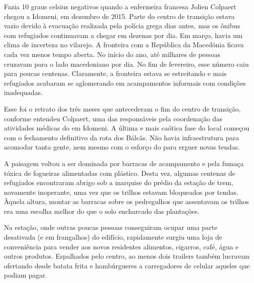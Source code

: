 \putodd{}
\clearpage
{}
 

Fazia 10 graus celsius negativos quando a enfermeira francesa Jolien
Colpaert chegou a Idomeni, em dezembro de 2015. Parte do centro de
transição estava vazio devido à evacuação realizada pela polícia grega
dias antes, mas os ônibus com refugiados continuavam a chegar em dezenas
por dia. Em março, havia um clima de incerteza no vilarejo. 
A fronteira com a República da Macedônia ficava cada vez menos
tempo aberta. No início do ano, até milhares de pessoas cruzavam para o
lado macedoniano por dia. No fim de fevereiro, esse número caiu para
poucas centenas. Claramente, a fronteira estava se estreitando e mais
refugiados acabaram se aglomerando em acampamentos informais com
condições inadequadas.

Esse foi o retrato dos três meses que antecederam o fim do centro de
transição, conforme entendeu Colpaert, uma das responsáveis pela coordenação das
atividades médicas do  em Idomeni. A última e mais
caótica fase do local começou com o fechamento definitivo da rota
dos Bálcãs. Não havia infraestrutura para acomodar tanta gente, nem
mesmo com o esforço do  para erguer novas tendas.

A paisagem voltou a ser dominada por barracas de acampamento e pela
fumaça tóxica de fogueiras alimentadas com plástico. Desta
vez, algumas centenas de refugiados encontraram abrigo sob a marquise do
prédio da estação de trem, novamente inoperante, uma vez que os trilhos
estavam bloqueados por tendas. Àquela altura, montar as barracas sobre os pedregulhos que assentavam os trilhos era uma escolha melhor do que o solo encharcado das plantações. 
% 
% 
% 
%
%


Na estação, onde outras poucas pessoas conseguiram ocupar uma parte
desativada (e em frangalhos) do edifício, rapidamente surgiu uma loja de
conveniência para vender aos novos residentes alimentos, cigarros, café,
água e outros produtos. Espalhados pelo centro, ao menos dois
trailers também lucravam ofertando desde batata frita e hambúrgueres a
carregadores de celular aqueles que podiam pagar.


